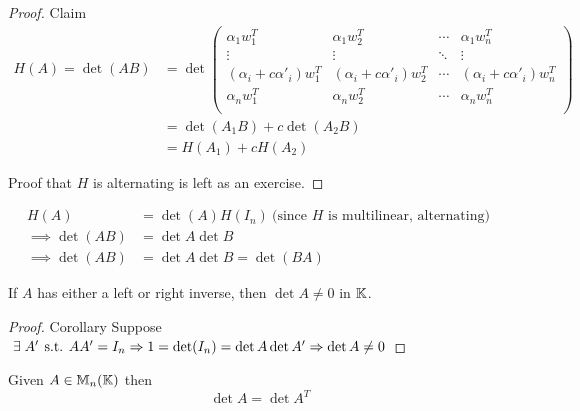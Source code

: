 \begin{proof} {Claim}
    \begin{align*}
        H(A) = \det(AB) & = \det \begin{pmatrix}
                                     \alpha_1 w_1^T               & \alpha_1 w_2^T               & \cdots & \alpha_1 w_n^T               \\
                                     \vdots                       & \vdots                       & \ddots & \vdots                       \\
                                     (\alpha_i + c\alpha'_i)w_1^T & (\alpha_i + c\alpha'_i)w_2^T & \cdots & (\alpha_i + c\alpha'_i)w_n^T \\
                                     \alpha_n w_1^T               & \alpha_n w_2^T               & \cdots & \alpha_n w_n^T               \\
                                 \end{pmatrix} \\
                        & =\det(A_1B) + c \det(A_2B)                                                                                 \\
                        & = H(A_1) + cH(A_2)
    \end{align*}

    Proof that \(H\) is alternating is left as an exercise.
\end{proof}

\begin{corollary}
    \begin{align*}
        H(A)              & = \det(A) H(I_n) \:\text{(since \(H\) is multilinear, alternating)}\: \\
        \implies \det(AB) & = \det A \det B                                                     \\
        \implies \det(AB) &= \det A \det B = \det(BA)
    \end{align*}
\end{corollary}

\begin{corollary}\label{cor:10_2}
    If \(A\) has either a left or right inverse, then \(\det A \neq 0\) in \(\mathbb{K}\).
\end{corollary}

\begin{proof} {Corollary}
    Suppose \(\exists A' \st AA' = I_n \implies 1 = \det(I_n) = \det A \det A' \implies \det A \neq 0\)
\end{proof}

\begin{proposition}
    Given \(A \in \mathbb{M}_n(\mathbb{K})\) then
    \[
        \det A = \det A^T
    \]
\end{proposition}

